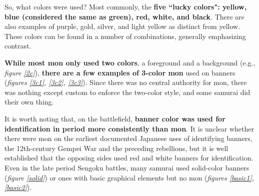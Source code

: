 \documentclass{article}
\begin{document}
  So, what colors were used?  Most commonly, the \textbf{five ``lucky
  colors": yellow, blue (considered the same as green),
  red, white, and
  black}. There are also examples
  of purple, gold, silver, and light yellow as distinct from yellow.
  These colors can be found in a number of
  combinations, generally emphasizing contrast.

  \textbf{While most mon only used two colors}, a foreground and a background
  (e.g., \emph{figure \ref{2c}}), \textbf{there are a few examples of 3-color mon}
  used on banners (\emph{figures \ref{3c1}, \ref{3c2},
  \ref{3c3}}). Since there was no central
  authority for mon, there was nothing except custom to enforce the
  two-color style, and some samurai did their own thing.

  It is worth noting that, on the battlefield, \textbf{banner color was used for identification in period more
  consistently than mon}.  It is unclear whether there were mon on the
  earliest documented Japanese uses of identifying banners, the
  12th-century Gempei War and the preceding rebellions, but it is well
  established that the opposing sides used red and white banners for
  identification. Even in the late period
  Sengoku battles, many samurai used solid-color
  banners (\emph{figure \ref{solid}}) or ones with basic graphical
  elements but no mon (\emph{figures \ref{basic1}, \ref{basic2}}).

\clearpage

  \begin{figure}
  \begin{subfigs}
  \end{subfigs}
  \begin{subfigs}
  \end{subfigs}
  \end{figure}
\end{document}
